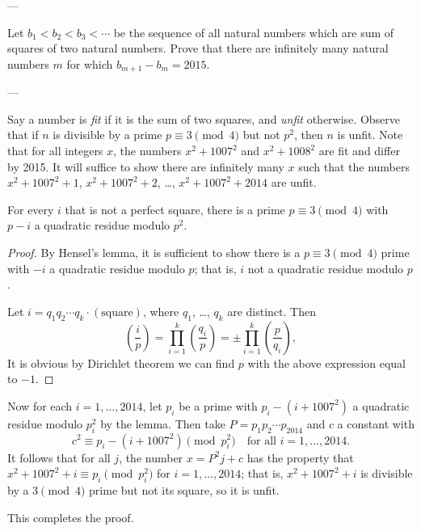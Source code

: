 
---

Let $b_1<b_2<b_3<\cdots$ be the sequence of all natural numbers which are sum of squares of two natural numbers.
Prove that there are infinitely many natural numbers $m$ for which $b_{m+1}-b_m=2015$.

---

Say a number is \emph{fit} if it is the sum of two squares, and \emph{unfit} otherwise. Observe that if $n$ is divisible by a prime $p\equiv3\pmod4$ but not $p^2$, then $n$ is unfit. Note that for all integers $x$, the numbers $x^2+1007^2$ and $x^2+1008^2$ are fit and differ by 2015. It will suffice to show there are infinitely many $x$ such that the numbers $x^2+1007^2+1$, $x^2+1007^2+2$, \ldots, $x^2+1007^2+2014$ are unfit.
\begin{lemma*}
    For every $i$ that is not a perfect square, there is a prime $p\equiv3\pmod4$ with $p-i$ a quadratic residue modulo $p^2$.
\end{lemma*}
\begin{proof}
    By Hensel's lemma, it is sufficient to show there is a $p\equiv3\pmod4$ prime with $-i$ a quadratic residue modulo $p$; that is, $i$ not a quadratic residue modulo $p$.

    Let $i=q_1q_2\cdots q_k\cdot(\text{square})$, where $q_1$, \ldots, $q_k$ are distinct. Then
    \[\left(\frac ip\right)=\prod_{i=1}^k\left(\frac{q_i}p\right)=\pm\prod_{i=1}^k\left(\frac p{q_i}\right),\]
    It is obvious by Dirichlet theorem we can find $p$ with the above expression equal to $-1$.
\end{proof}

Now for each $i=1,\ldots,2014$, let $p_i$ be a prime with $p_i-(i+1007^2)$ a quadratic residue modulo $p_i^2$ by the lemma. Then take $P=p_1p_2\cdots p_{2014}$ and $c$ a constant with
\[c^2\equiv p_i-(i+1007^2)\pmod{p_i^2}\quad\text{for all }i=1,\ldots,2014.\]
It follows that for all $j$, the number $x=P^2j+c$ has the property that $x^2+1007^2+i\equiv p_i\pmod{p_i^2}$ for $i=1,\ldots,2014$; that is, $x^2+1007^2+i$ is divisible by a $3\pmod4$ prime but not its square, so it is unfit.

This completes the proof.
